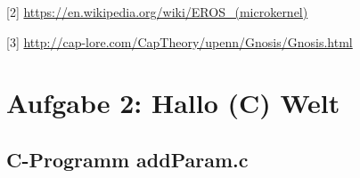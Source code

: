 \documentclass[numbers=noendperiod]{scrartcl}
\begin{document}
[2] \url{https://en.wikipedia.org/wiki/EROS_(microkernel)}

[3] \url{http://cap-lore.com/CapTheory/upenn/Gnosis/Gnosis.html}

\section*{Aufgabe 2: Hallo (C) Welt}

\subsection*{C-Programm addParam.c}

\begin{minipage}{\textwidth}
	
\inputminted[mathescape,breaklines,bgcolor=bg,linenos,numbersep=5pt,tabsize=3]{c}{addParam.c}

\end{minipage}
\end{document}
